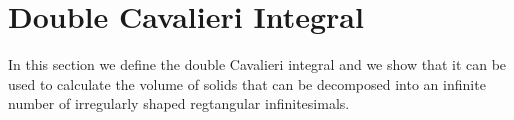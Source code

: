 \documentclass{article}
\theoremstyle{theorem}
\theoremstyle{definition}
\begin{document}
% 
% 

\section{Double Cavalieri Integral}
In this section we define the double Cavalieri integral and we show that it can be used to calculate the volume of solids that can be decomposed into an infinite 
number of irregularly shaped regtangular infinitesimals.\\
\end{document}
